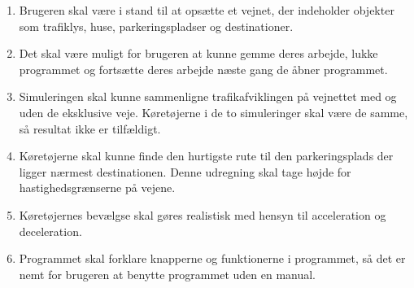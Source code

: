 \begin{enumerate}
\item Brugeren skal være i stand til at opsætte et vejnet, der indeholder objekter som trafiklys, huse, parkeringspladser og destinationer.
\item Det skal være muligt for brugeren at kunne gemme deres arbejde, lukke programmet og fortsætte deres arbejde næste gang de åbner programmet.
\item Simuleringen skal kunne sammenligne trafikafviklingen på vejnettet med og uden de eksklusive veje. Køretøjerne i de to simuleringer skal være de samme, så resultat ikke er tilfældigt.
\item Køretøjerne skal kunne finde den hurtigste rute til den parkeringsplads der ligger nærmest destinationen. Denne udregning skal tage højde for hastighedsgrænserne på vejene.
\item Køretøjernes bevælgse skal gøres realistisk med hensyn til acceleration og deceleration.
\item Programmet skal forklare knapperne og funktionerne i programmet, så det er nemt for brugeren at benytte programmet uden en manual.
\end{enumerate}
